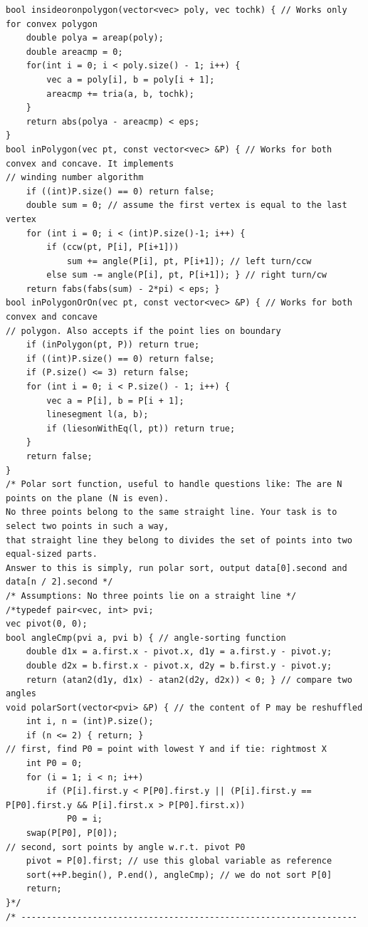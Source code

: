 \documentclass[8pt, a4paper, oneside, twocolumn]{extarticle}
\begin{document}
\begin{verbatim}
bool insideoronpolygon(vector<vec> poly, vec tochk) { // Works only for convex polygon
    double polya = areap(poly);
    double areacmp = 0;
    for(int i = 0; i < poly.size() - 1; i++) {
        vec a = poly[i], b = poly[i + 1];
        areacmp += tria(a, b, tochk);
    }
    return abs(polya - areacmp) < eps;
}
bool inPolygon(vec pt, const vector<vec> &P) { // Works for both convex and concave. It implements
// winding number algorithm
    if ((int)P.size() == 0) return false;
    double sum = 0; // assume the first vertex is equal to the last vertex
    for (int i = 0; i < (int)P.size()-1; i++) {
        if (ccw(pt, P[i], P[i+1]))
            sum += angle(P[i], pt, P[i+1]); // left turn/ccw
        else sum -= angle(P[i], pt, P[i+1]); } // right turn/cw
    return fabs(fabs(sum) - 2*pi) < eps; }
bool inPolygonOrOn(vec pt, const vector<vec> &P) { // Works for both convex and concave
// polygon. Also accepts if the point lies on boundary
    if (inPolygon(pt, P)) return true;
    if ((int)P.size() == 0) return false;
    if (P.size() <= 3) return false;
    for (int i = 0; i < P.size() - 1; i++) {
        vec a = P[i], b = P[i + 1];
        linesegment l(a, b);
        if (liesonWithEq(l, pt)) return true;
    }
    return false;
}
/* Polar sort function, useful to handle questions like: The are N points on the plane (N is even).
No three points belong to the same straight line. Your task is to select two points in such a way,
that straight line they belong to divides the set of points into two equal-sized parts.
Answer to this is simply, run polar sort, output data[0].second and data[n / 2].second */
/* Assumptions: No three points lie on a straight line */
/*typedef pair<vec, int> pvi;
vec pivot(0, 0);
bool angleCmp(pvi a, pvi b) { // angle-sorting function
    double d1x = a.first.x - pivot.x, d1y = a.first.y - pivot.y;
    double d2x = b.first.x - pivot.x, d2y = b.first.y - pivot.y;
    return (atan2(d1y, d1x) - atan2(d2y, d2x)) < 0; } // compare two angles
void polarSort(vector<pvi> &P) { // the content of P may be reshuffled
    int i, n = (int)P.size();
    if (n <= 2) { return; }
// first, find P0 = point with lowest Y and if tie: rightmost X
    int P0 = 0;
    for (i = 1; i < n; i++)
        if (P[i].first.y < P[P0].first.y || (P[i].first.y == P[P0].first.y && P[i].first.x > P[P0].first.x))
            P0 = i;
    swap(P[P0], P[0]);
// second, sort points by angle w.r.t. pivot P0
    pivot = P[0].first; // use this global variable as reference
    sort(++P.begin(), P.end(), angleCmp); // we do not sort P[0]
    return;
}*/
/* ------------------------------------------------------------------

\end{verbatim}
\end{document}
